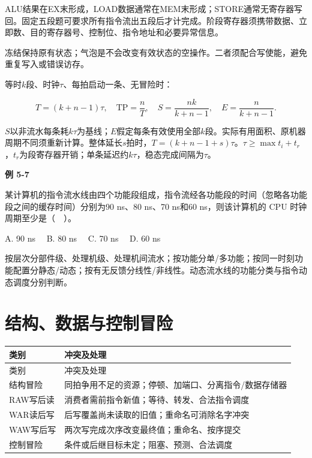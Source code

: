ALU结果在EX末形成，LOAD数据通常在MEM末形成；STORE通常无寄存器写回。固定五段题可要求所有指令流出五段后才计完成。阶段寄存器须携带数据、立即数、目的寄存器号、控制位、指令地址和必要异常信息。

冻结保持原有状态；气泡是不会改变有效状态的空操作。二者须配合写使能，避免重复写入或错误访存。

等时\(k\)段、时钟\(\tau\)、每拍启动一条、无冒险时：

\[
T=(k+n-1)\tau,\quad \mathrm{TP}=\frac{n}{T},\quad
S=\frac{nk}{k+n-1},\quad E=\frac{n}{k+n-1}.
\]

\(S\)以非流水每条耗\(k\tau\)为基线；\(E\)假定每条有效使用全部\(k\)段。实际有用面积、原机器周期不同须重新计算。整体延长\(s\)拍时，\(T=(k+n-1+s)\tau\)。\(\tau\ge\max t_i+t_r\)，\(t_r\)为段寄存器开销；单条延迟约\(k\tau\)，稳态完成间隔为\(\tau\)。

\par\medskip{}\noindent\hypertarget{CO05-E07}{}\label{CO05-E07}\textbf{例 5-7}\par\nobreak\smallskip

某计算机的指令流水线由四个功能段组成，指令流经各功能段的时间（忽略各功能段之间的缓存时间）分别为90 ns、80 ns、70 ns和60 ns，则该计算机的 CPU 时钟周期至少是（　）。

A. 90 ns　 B. 80 ns　 C. 70 ns　 D. 60 ns

按层次分部件级、处理机级、处理机间流水；按功能分单/多功能；按同一时刻功能配置分静态/动态；按有无反馈分线性/非线性。动态流水线的功能分类与指令动态调度分别判断。

\section{结构、数据与控制冒险}\label{CO05-hazard}

\par\smallskip
{\fontsize{9.3}{12}\selectfont\setlength{\tabcolsep}{2.5pt}\setlength{\LTleft}{0pt}\setlength{\LTright}{0pt}
\begin{longtable}{@{}>{\raggedright\arraybackslash}p{}>{\raggedright\arraybackslash}p{}@{}}
\toprule
类别 & 冲突及处理 \\

\midrule\endfirsthead\toprule
类别 & 冲突及处理 \\

\midrule\endhead\bottomrule\endfoot
结构冒险 & 同拍争用不足的资源；停顿、加端口、分离指令/数据存储器 \\

RAW写后读 & 消费者需前指令新值；等待、转发、合法指令调度 \\

WAR读后写 & 后写覆盖尚未读取的旧值；重命名可消除名字冲突 \\

WAW写后写 & 两次写完成次序改变最终值；重命名、按序提交 \\

控制冒险 & 条件或后继目标未定；阻塞、预测、合法调度 \\

\end{longtable}}
\par\smallskip

